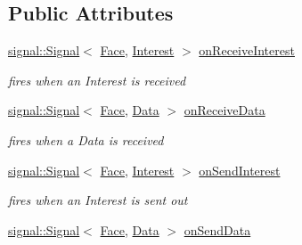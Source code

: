 \subsection*{Public Attributes}
\begin{DoxyCompactItemize}
\item 
\hyperlink{classndn_1_1util_1_1signal_1_1Signal}{signal\+::\+Signal}$<$ \hyperlink{classnfd_1_1Face}{Face}, \hyperlink{classndn_1_1Interest}{Interest} $>$ \hyperlink{classnfd_1_1Face_a7f95900b9196ccf7066c08f95b7ed08f}{on\+Receive\+Interest}\hypertarget{classnfd_1_1Face_a7f95900b9196ccf7066c08f95b7ed08f}{}\label{classnfd_1_1Face_a7f95900b9196ccf7066c08f95b7ed08f}

\begin{DoxyCompactList}\small\item\em fires when an Interest is received \end{DoxyCompactList}\item 
\hyperlink{classndn_1_1util_1_1signal_1_1Signal}{signal\+::\+Signal}$<$ \hyperlink{classnfd_1_1Face}{Face}, \hyperlink{classndn_1_1Data}{Data} $>$ \hyperlink{classnfd_1_1Face_a6989b109e5022c7a46234296a3e91ef8}{on\+Receive\+Data}\hypertarget{classnfd_1_1Face_a6989b109e5022c7a46234296a3e91ef8}{}\label{classnfd_1_1Face_a6989b109e5022c7a46234296a3e91ef8}

\begin{DoxyCompactList}\small\item\em fires when a Data is received \end{DoxyCompactList}\item 
\hyperlink{classndn_1_1util_1_1signal_1_1Signal}{signal\+::\+Signal}$<$ \hyperlink{classnfd_1_1Face}{Face}, \hyperlink{classndn_1_1Interest}{Interest} $>$ \hyperlink{classnfd_1_1Face_a3882239e8eccb1e81d6e3c0ca9ba4736}{on\+Send\+Interest}\hypertarget{classnfd_1_1Face_a3882239e8eccb1e81d6e3c0ca9ba4736}{}\label{classnfd_1_1Face_a3882239e8eccb1e81d6e3c0ca9ba4736}

\begin{DoxyCompactList}\small\item\em fires when an Interest is sent out \end{DoxyCompactList}\item 
\hyperlink{classndn_1_1util_1_1signal_1_1Signal}{signal\+::\+Signal}$<$ \hyperlink{classnfd_1_1Face}{Face}, \hyperlink{classndn_1_1Data}{Data} $>$ \hyperlink{classnfd_1_1Face_a42d3322f34fc022734dd42c9ac51701c}{on\+Send\+Data}\hypertarget{classnfd_1_1Face_a42d3322f34fc022734dd42c9ac51701c}{}\label{classnfd_1_1Face_a42d3322f34fc022734dd42c9ac51701c}


\end{DoxyCompactItemize}
